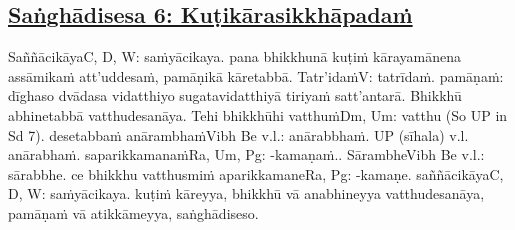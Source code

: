 \subsection*{\hyperref[comm6]{Saṅghādisesa 6: Kuṭikārasikkhāpadaṁ}}
\label{sd6}

Saññācikāya\makeatletter\hyperlink{endnote-appendix}\makeatother C, D, W: saṁyācikaya. pana bhikkhunā kuṭiṁ kārayamānena assāmikaṁ att'uddesaṁ, pamāṇikā kāretabbā. Tatr'idaṁ\makeatletter\hyperlink{endnote-appendix}\makeatother V: tatrīdaṁ. pamāṇaṁ: dīghaso dvādasa vidatthiyo sugatavidatthiyā tiriyaṁ satt'antarā. Bhikkhū abhinetabbā vatthudesanāya. Tehi bhikkhūhi vatthuṁ\makeatletter\hyperlink{endnote-appendix}\makeatother Dm, Um: vatthu (So UP in Sd 7). desetabbaṁ anārambhaṁ\makeatletter\hyperlink{endnote-appendix}\makeatother Vibh Be v.l.: anārabbhaṁ. UP (sīhala) v.l. anārabhaṁ. saparikkamanaṁ\makeatletter\hyperlink{endnote-appendix}\makeatother Ra, Um, Pg: -kamaṇaṁ.. Sārambhe\makeatletter\hyperlink{endnote-appendix}\makeatother Vibh Be v.l.: sārabbhe. ce bhikkhu vatthusmiṁ aparikkamane\makeatletter\hyperlink{endnote-appendix}\makeatother Ra, Pg: -kamaṇe. saññācikāya\makeatletter\hyperlink{endnote-appendix}\makeatother C, D, W: saṁyācikaya. kuṭiṁ kāreyya, bhikkhū vā anabhineyya vatthudesanāya, pamāṇaṁ vā atikkāmeyya, saṅghādiseso.



